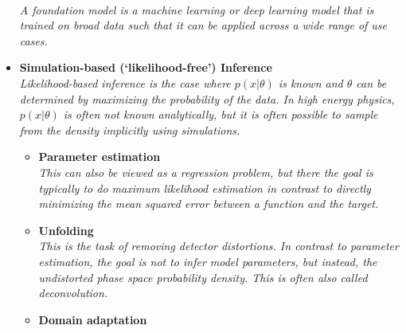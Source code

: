 \documentclass[12pt,letterpaper]{article}
\begin{document}
\begin{itemize}
\\\textit{A foundation model is a machine learning or deep learning model that is trained on broad data such that it can be applied across a wide range of use cases.}
\item \textbf{Simulation-based (`likelihood-free') Inference}
\\\textit{Likelihood-based inference is the case where $p(x|\theta)$ is known and $\theta$ can be determined by maximizing the probability of the data.  In high energy physics, $p(x|\theta)$ is often not known analytically, but it is often possible to sample from the density implicitly using simulations.}
	\begin{itemize}
		\item \textbf{Parameter estimation}~\cite{Heimel:2024drk,Maitre:2024hzp,Bahl:2024meb,JETSCAPE:2024cqe,Mastandrea:2024irf,Diaz:2024yfu,Alvarez:2024owq,Chatterjee:2024pbp,Chai:2024zyl,Heimel:2023mvw,Espejo:2023wzf,Barrue:2023ysk,Morandini:2023pwj,Erdogan:2023uws,Breitenmoser:2023tmi,Heinrich:2023bmt,Rizvi:2023mws,Neubauer:2022gbu,Butter:2022vkj,Arganda:2022zbs,Kong:2022rnd,Arganda:2022qzy,Bahl:2021dnc,Barman:2021yfh,Mishra-Sharma:2021oxe,NEURIPS2020_a878dbeb,Chatterjee:2021nms,Nachman:2021yvi,Bieringer:2020tnw,Flesher:2020kuy,Coogan:2020yux,Andreassen:2020gtw,Cranmer:2015bka,Brehmer:2018hga,Brehmer:2019xox,Brehmer:2018eca,Brehmer:2018kdj,Hollingsworth:2020kjg,Stoye:2018ovl,Andreassen:2019nnm}
		\\\textit{This can also be viewed as a regression problem, but there the goal is typically to do maximum likelihood estimation in contrast to directly minimizing the mean squared error between a function and the target.}
		\item \textbf{Unfolding}~\cite{Butter:2024vbx,Duarte:2024lsg,Zhu:2024drd,Desai:2024kpd,Huetsch:2024quz,Shmakov:2024gkd,Shmakov:2023kjj,Chan:2023tbf,Backes:2022vmn,Arratia:2022wny,Wong:2021zvv,Arratia:2021otl,H1:2021wkz,Komiske:2021vym,Andreassen:2021zzk,Baron:2021vvl,Howard:2021pos,Vandegar:2020yvw,1800956,Zech2003BinningFreeUB,Lindemann:1995ut,Martschei:2012pr,Glazov:2017vni,Gagunashvili:2010zw,Bellagente:2019uyp,Datta:2018mwd,Andreassen:2019cjw,Mieskolainen:2018fhf}
		\\\textit{This is the task of removing detector distortions.  In contrast to parameter estimation, the goal is not to infer model parameters, but instead, the undistorted phase space probability density.  This is often also called deconvolution.}
		\item \textbf{Domain adaptation}~\cite{Glazier:2024ogg,Kelleher:2024jsh,Kelleher:2024rmb,Zhao:2024ely,Algren:2023qnb,Schreck:2023pzs,Camaiani:2022kul,Nachman:2021opi,Diefenbacher:2020rna,Cranmer:2015bka,Andreassen:2019nnm,Rogozhnikov:2016bdp}

\end{itemize}
\end{itemize}
\end{document}
